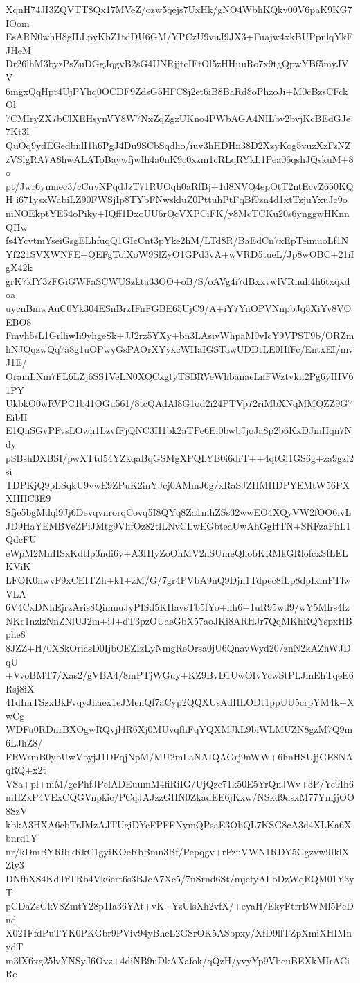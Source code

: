 XqnH74JI3ZQVTT8Qx17MVeZ/ozw5qejs7UxHk/gNO4WbhKQkv00V6paK9KG7IOom
EsARN0whH8gILLpyKbZ1tdDU6GM/YPCzU9vuJ9JX3+Fuajw4xkBUPpnlqYkFJHeM
Dr26lhM3byzPsZuDGgJqgvB2sG4UNRjjtcIFtOl5zHHuuRo7x9tgQpwYBf5myJVV
6mgxQqHpt4UjPYhq0OCDF9ZdsG5HFC8j2et6iB8BaRd8oPhzoJi+M0cBzsCFckOl
7CMIryZX7bClXEHsynVY8W7NxZqZgzUKno4PWbAGA4NILbv2bvjKcBEdGJe7Kt3l
QuOq9ydEGedbiilI1h6PgJ4Du9SCbSqdho/iuv3hHDHn38D2XzyKog5vuzXzFzNZ
zVSlgRA7A8hwALAToBaywfjwIh4a0nK9c0xzm1cRLqRYkL1Pea06qshJQskuM+8o
pt/Jwr6ymnec3/cCuvNPqdJzT71RUOqh0aRfBj+1d8NVQ4epOtT2ntEcvZ650KQH
i671ysxWabiLZ90FWSjIp8TYbFNwskluZ0PttuhPtFqBf9zn4d1xtTzjuYxuJc9o
niNOEkptYE54oPiky+IQff1DxoUU6rQcVXPCiFK/y8McTCKu20s6ynggwHKnnQHw
fs4YcvtmYseiGsgELhfuqQ1GIcCnt3pYke2hM/LTd8R/BaEdCn7xEpTeimuoLf1N
Yf221SVXWNFE+QEFgTolXoW9SlZyO1GPd3vA+wVRD5tueL/Jp8wOBC+21iIgX42k
grK7kIY3zFGiGWFaSCWUSzkta33OO+oB/S/oAVg4i7dBxxvwlVRnuh4h6txqxdoa
uycnBmwAuC0Yk304ESnBrzIFnFGBE65UjC9/A+iY7YnOPVNnpbJq5XiYv8VOEBO8
Fmvh5sL1GrlliwIi9yhgeSk+JJ2rz5YXy+bn3LAsivWhpaM9vIcY9VPST9b/ORZm
hNJQqzwQq7a8g1uOPwyGsPAOrXYyxcWHaIGSTawUDDtLE0HfFc/EntxEI/mvJ1E/
OramLNm7FL6LZj6SS1VeLN0XQCxgtyTSBRVeWhbanaeLnFWztvkn2Pg6yIHV61PY
UkbkO0wRVPC1b41OGu561/8tcQAdAl8G1od2i24PTVp72riMbXNqMMQZZ9G7EibH
E1QnSGvPFvsLOwh1LzvfFjQNC3H1bk2aTPe6Ei0bwbJjoJa8p2b6KxDJmHqn7Ndy
pSBshDXBSI/pwXTtd54YZkqaBqGSMgXPQLYB0i6drT++4qtGl1GS6g+za9gzi2si
TDPKjQ9pLSqkU9vwE9ZPuK2inYJcj0AMmJ6g/xRaSJZHMHDPYEMtW56PXXHHC3E9
Sfje5bgMdql9Jj6DevqvnrorqCovq5I8QYq8Za1mhZSs32wwEO4XQyVW2fOO6ivL
JD9HaYEMBVeZPiJMtg9VhfOz82tlLNvCLwEGbteaUwAhGgHTN+SRFzaFhL1QdcFU
eWpM2MnHSxKdtfp3ndi6v+A3IIIyZoOnMV2nSUmeQhobKRMkGRlofcxSfLELKViK
LFOK0nwvF9xCEITZh+k1+zM/G/7gr4PVbA9nQ9Djn1Tdpec8fLp8dpIxmFTlwVLA
6V4CxDNhEjrzAris8QimnuJyPISd5KHavsTb5fYo+hh6+1uR95wd9/wY5Mlrs4fz
NKc1nzlzNnZNlUJ2m+iJ+dT3pzOUaeGbX57aoJKi8ARHJr7QqMKhRQYspxHBphe8
8JZZ+H/0XSkOriasD0IjbOEZIzLyNmgReOrsa0jU6QnavWyd20/znN2kAZhWJDqU
+VvoBMT7/Xas2/gVBA4/8mPTjWGuy+KZ9BvD1UwOIvYcwStPLJmEhTqeE6Rsj8iX
41dImTSzxBkFvqyJhaex1eJMenQf7aCyp2QQXUsAdHLODt1ppUU5crpYM4k+XwCg
WDFu0RDnrBXOgwRQvjl4R6Xj0MUvqfhFqYQXMJkL9biWLMUZN8gzM7Q9m6LJhZ8/
FRWrmB0ybUwVbyjJ1DFqjNpM/MU2mLaNAIQAGrj9nWW+6hnHSUjjGE8NAqRQ+x2t
VSa+pl+niM/gcPhfJPclADEuumM4fiRiIG/UjQze71k50E5YrQnJWv+3P/Ye9Ih6
mHZxP4VExCQGVnpkic/PCqJAJzzGHN0ZkadEE6jKxw/NSkd9dsxM77YmjjOO8SzV
kbkA3HXA6cbTrJMzAJTUgiDYcFPFFNymQPsaE3ObQL7KSG8cA3d4XLKa6Xbnrd1Y
nr/kDmBYRibkRkC1gyiKOeRbBmn3Bf/Pepqgv+rFzuVWN1RDY5Ggzvw9IklXZiy3
DNfbXS4KdTrTRb4Vk6ert6s3BJeA7Xc5/7nSrnd6St/mjctyALbDzWqRQM01Y3yT
pCDaZsGkV8ZmtY28p1Ia36YAt+vK+YzUlsXh2vfX/+eyaH/EkyFtrrBWMl5PcDnd
X021FfdPuTYK0PKGbr9PViv94yBheL2GSrOK5ASbpxy/XfD9llTZpXmiXHIMnydT
m3lX6xg25lvYNSyJ6Ovz+4diNB9uDkAXafok/qQzH/yvyYp9VbcuBEXkMIrACiRe
